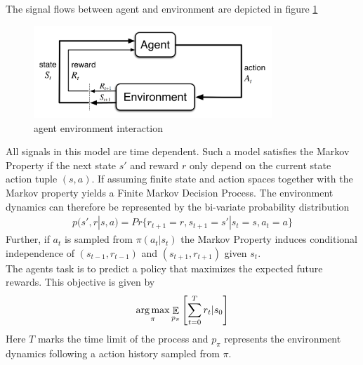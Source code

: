 The signal flows between agent and environment are depicted in figure \ref{fig_rl_gen}

\begin{figure}
	\centering
	\includegraphics[width=0.8\textwidth]{figures/rl/agent_env_interface}
	\caption{agent environment interaction \cite{SB_all}}
	\label{fig_rl_gen}
\end{figure}

All signals in this model are time dependent. 
Such a model satisfies the Markov Property if the next state $s'$ and reward $r$ only depend on the current state action tuple $(s, a)$. If assuming finite state and action spaces together with the Markov property yields a Finite Markov Decision Process. The environment dynamics can therefore be represented by the bi-variate probability distribution
\begin{align}
	p(s', r|s, a) = Pr\{r_{t+1}=r, s_{t+1} = s' | s_t=s, a_t=a\}
\end{align}
Further, if $a_t$ is sampled from $\pi(a_t|s_t)$ the Markov Property induces conditional independence of $(s_{t-1}, r_{t-1})$ and $(s_{t+1}, r_{t+1})$ given $s_t$. \\

The agents task is to predict a policy that maximizes the expected future rewards. This objective is given by
\begin{align}
	\operatorname*{arg\,max}_{\pi}\mathop{\mathbb{E}}_{p_{\pi}}\left[\sum_{t=0}^T r_t | s_0\right]
\end{align}
Here $T$ marks the time limit of the process and $p_{\pi}$ represents the environment dynamics following a action history sampled from $\pi$.\\

